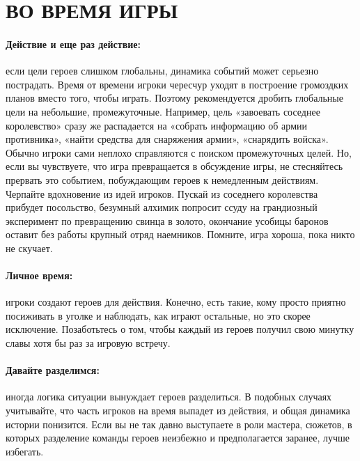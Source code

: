\section{ВО ВРЕМЯ ИГРЫ}
\paragraph{Действие и еще раз действие:} если цели героев слишком глобальны, динамика событий может серьезно пострадать. Время от времени игроки чересчур уходят в построение громоздких планов вместо того, чтобы играть. Поэтому рекомендуется дробить глобальные цели на небольшие, промежуточные. Например, цель «завоевать соседнее королевство» сразу же распадается на «собрать информацию об армии противника», «найти средства для снаряжения армии», «снарядить войска». Обычно игроки сами неплохо справляются с поиском промежуточных целей. Но, если вы чувствуете, что игра превращается в обсуждение игры, не стесняйтесь прервать это событием, побуждающим героев к немедленным действиям. Черпайте вдохновение из идей игроков. Пускай из соседнего королевства прибудет посольство, безумный алхимик попросит ссуду на грандиозный эксперимент по превращению свинца в золото, окончание усобицы баронов оставит без работы крупный отряд наемников. Помните, игра хороша, пока никто не скучает.
\paragraph{Личное время:} игроки создают героев для действия. Конечно, есть такие, кому просто приятно посиживать в уголке и наблюдать, как играют остальные, но это скорее исключение. Позаботьтесь о том, чтобы каждый из героев получил свою минутку славы хотя бы раз за игровую встречу.
\paragraph{Давайте разделимся:} иногда логика ситуации вынуждает героев разделиться. В подобных случаях учитывайте, что часть игроков на время выпадет из действия, и общая динамика истории понизится. Если вы не так давно выступаете в роли мастера, сюжетов, в которых разделение команды героев неизбежно и предполагается заранее, лучше избегать.
